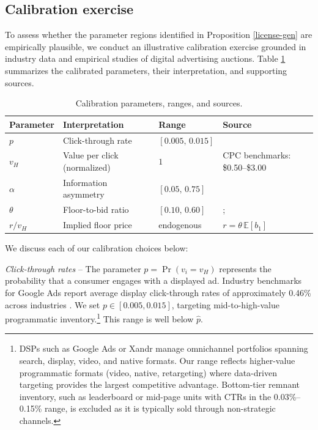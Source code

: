 \subsection{Calibration exercise}\label{sect:calibration}

To assess whether the parameter regions identified in Proposition \ref{license-gen} are empirically plausible, we conduct an illustrative calibration exercise grounded in industry data and empirical studies of digital advertising auctions. Table \ref{tab:calibration-params} summarizes the calibrated parameters, their interpretation, and supporting sources.

\begin{table}[h!]
\centering
\small
\begin{tabular}{@{}lllp{5.2cm}@{}}
\toprule
\textbf{Parameter} & \textbf{Interpretation} & \textbf{Range} & \textbf{Source} \\
\midrule
$p$ & Click-through rate & $[0.005, \, 0.015]$ & \textcite{irvineGoogleAdsBenchmarks} \\[3pt]
$v_H$ & Value per click (normalized) & $1$ & CPC benchmarks: \$0.50--\$3.00 \\[3pt]
$\alpha$ & Information asymmetry & $[0.05, \, 0.75]$ & \textcite{competitionandmarketsauthorityOnlinePlatformsDigital2020} \\[3pt]
$\theta$ & Floor-to-bid ratio & $[0.10, \, 0.60]$ & \textcite{choiOptimizingReservePrices2023}; \textcite{fengReservePriceOptimization2021} \\[3pt]
$r / v_H$ & Implied floor price & endogenous & $r = \theta \, \mathbb{E}[b_1]$ \\
\bottomrule
\end{tabular}
\caption{Calibration parameters, ranges, and sources.}
\label{tab:calibration-params}
\end{table}

\noindent We discuss each of our calibration choices below:\par

\noindent \textit{Click-through rates} -- The parameter $p = \Pr(v_i = v_H)$ represents the probability that a consumer engages with a displayed ad. Industry benchmarks for Google Ads report average display click-through rates of approximately 0.46\% across industries \parencite{irvineGoogleAdsBenchmarks}. We set $p \in [0.005, 0.015]$, targeting mid-to-high-value programmatic inventory.\footnote{DSPs such as Google Ads or Xandr manage omnichannel portfolios spanning search, display, video, and native formats. Our range reflects higher-value programmatic formats (video, native, retargeting) where data-driven targeting provides the largest competitive advantage. Bottom-tier remnant inventory, such as leaderboard or mid-page units with CTRs in the 0.03\%--0.15\% range, is excluded as it is typically sold through non-strategic channels.} This range is well below $\hat{p}$. \par

